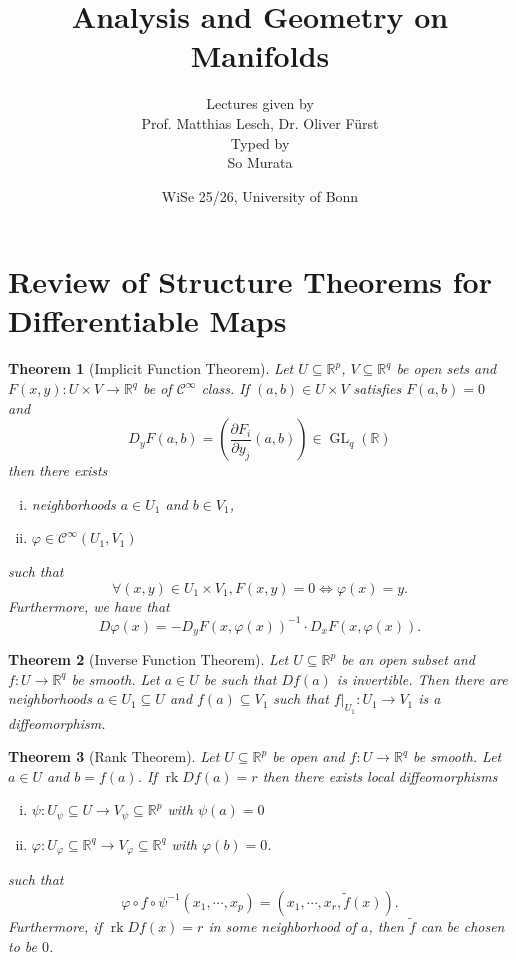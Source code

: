 \documentclass[10pt]{article}
\title{Analysis and Geometry on Manifolds}
\author{Lectures given by\\Prof. Matthias Lesch, Dr. Oliver Fürst\\Typed by\\So Murata}
\date{WiSe 25/26, University of Bonn}
\newtheorem{theorem}{Theorem} [section]
\DeclareMathOperator{\GL}{GL}
\DeclareMathOperator{\rk}{rk}
\newcommand{\R}[0]{\mathbb{R}}
\begin{document}
\maketitle
\section{Review of Structure Theorems for Differentiable Maps}

\begin{theorem}[Implicit Function Theorem]
Let $U\subseteq\R^p$, $V\subseteq\R^q$ be open sets and $F(x,y):U\times V\to \R^{q}$ be of $\mathcal{C}^\infty$ class. If $(a,b)\in U\times V$ satisfies $F(a,b)=0$ and 
\begin{equation*}
D_yF(a,b) = \left({\frac {\partial F_i} {\partial y_j}}(a,b)\right)\in\GL_q(\R)
\end{equation*}
 then there exists 
\begin{enumerate}[i).]
\item neighborhoods $a\in U_1$ and $b\in V_1$,
\item $\varphi\in\mathcal{C}^\infty(U_1,V_1)$
\end{enumerate}
such that 
\begin{equation*}
\forall (x,y)\in U_1\times V_1, F(x,y) = 0\Leftrightarrow \varphi(x)=y.
\end{equation*}
Furthermore, we have that
\begin{equation*}
D\varphi(x) = -D_yF(x,\varphi(x))^{-1}\cdot D_xF(x,\varphi(x)).
\end{equation*}
\end{theorem}

\begin{theorem}[Inverse Function Theorem]
Let $U\subseteq\R^p$ be an open subset and $f:U\to\R^q$ be smooth. Let $a\in U$ be such that $Df(a)$ is invertible. Then there are neighborhoods $a\in U_1\subseteq U$ and $f(a)\subseteq V_1$ such that $f|_{U_1}:U_1\to V_1$ is a diffeomorphism.
\end{theorem}

\begin{theorem}[Rank Theorem]
Let $U\subseteq\R^p$ be open and $f:U\to\R^q$ be smooth. Let $a\in U$ and $b=f(a)$. If $\rk Df(a)=r$ then there exists local diffeomorphisms
\begin{enumerate}[i).]
\item $\psi:U_\psi\subseteq U\to V_\psi\subseteq\R^p$ with $\psi(a)=0$ 
\item $\varphi:U_\varphi\subseteq \R^q\to V_\varphi\subseteq\R^q$ with $\varphi(b)=0$.
\end{enumerate}
such that 
\begin{equation*}
\varphi\circ f\circ \psi^{-1}(x_1,\cdots,x_p)= (x_1,\cdots,x_r,\tilde{f}(x)).
\end{equation*}
Furthermore, if $\rk Df(x)=r$ in some neighborhood of $a$, then $\tilde{f}$ can be chosen to be $0$.
\end{theorem}
\end{document}
